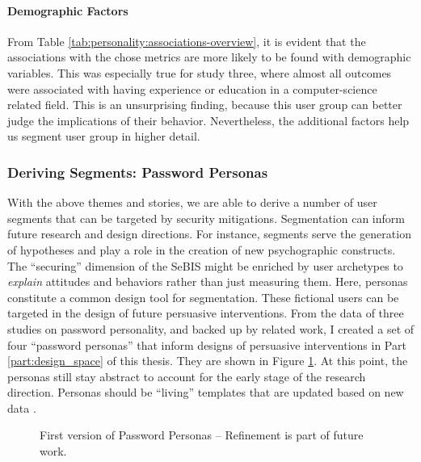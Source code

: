\paragraph{Demographic Factors}
From Table \ref{tab:personality:associations-overview}, it is evident that the associations with the chose metrics are more likely to be found with demographic variables. This was especially true for study three, where almost all outcomes were associated with having experience or education in a computer-science related field. This is an unsurprising finding, because this user group can better judge the implications of their behavior. Nevertheless, the additional factors help us segment user group in higher detail. 

\subsubsection{Deriving Segments: Password Personas}
With the above themes and stories, we are able to derive a number of user segments that can be targeted by security mitigations. Segmentation can inform future research and design directions. For instance, segments serve the generation of hypotheses and play a role in the creation of new psychographic constructs. The ``securing'' dimension of the \gls{SeBIS} might be enriched by user archetypes to \textit{explain} attitudes and behaviors rather than just measuring them. Here, \glspl{persona} constitute a common design tool for segmentation. These fictional users can be targeted in the design of future persuasive interventions. From the data of three studies on password personality, and backed up by related work, I created a set of four ``password personas'' that inform designs of persuasive interventions in Part \ref{part:design_space} of this thesis. They are shown in Figure \ref{fig:personality:personas}. At this point, the personas still stay abstract to account for the early stage of the research direction. Personas should be ``living'' templates that are updated based on new data \cite{Gothelf2013LeanUX}. 

\begin{figure}
	\centering
	\caption{\label{fig:personality:personas} First version of Password Personas -- Refinement is part of future work.}
\end{figure}

